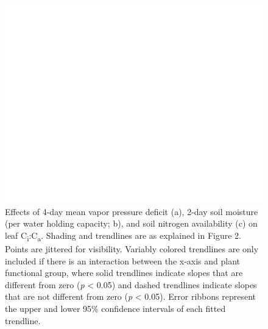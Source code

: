 \newpage
\begin{figure}
    \centering
    \includegraphics[scale = 0.07]{ch4_TXeco/figs/TXeco_fig3_chi.png}
    \caption[Effects of 4-day mean vapor pressure deficit, 2-day soil moisture (per water holding capacity), and soil nitrogen availability on leaf C\textsubscript{i}:C\textsubscript{a}. ]{Effects of 4-day mean vapor pressure deficit (a), 2-day soil moisture (per water holding capacity; b), and soil nitrogen availability (c) on leaf C\textsubscript{i}:C\textsubscript{a}. Shading and trendlines are as explained in Figure 2. Points are jittered for visibility. Variably colored trendlines are only included if there is an interaction between the x-axis and plant functional group, where solid trendlines indicate slopes that are different from zero (\textit{p} < 0.05) and dashed trendlines indicate slopes that are not different from zero (\textit{p} < 0.05). Error ribbons represent the upper and lower 95\% confidence intervals of each fitted trendline.}
    \label{fig:figure4.3}
\end{figure}
\clearpage

